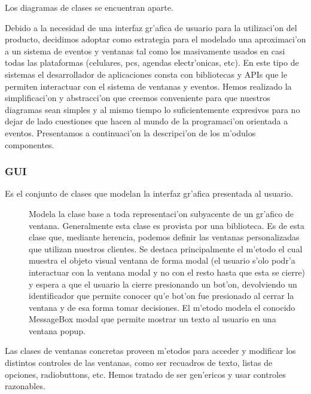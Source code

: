 Los diagramas de clases se encuentran aparte.

Debido a la necesidad de una interfaz gr'afica de usuario para la utilizaci'on del producto, decidimos adoptar como estrategia para el modelado una aproximaci'on a un sistema de eventos y ventanas tal como los masivamente usados en casi todas las plataformas (celulares, pcs, agendas electr'onicas, etc). En este tipo de sistemas el desarrollador de aplicaciones consta con bibliotecas y APIs que le permiten interactuar con el sistema de ventanas y eventos. Hemos realizado la simplificaci'on y abstracci'on que creemos conveniente para que nuestros diagramas sean simples y al mismo tiempo lo suficientemente expresivos para no dejar de lado cuestiones que hacen al mundo de la programaci'on orientada a eventos.
Presentamos a continuaci'on la descripci'on de los m'odulos componentes.
\clearpage

\subsubsection{GUI}
Es el conjunto de clases que modelan la interfaz gr'afica presentada al usuario.


\begin{description}
\item[] Modela la clase base a toda representaci'on subyacente de un gr'afico de ventana. Generalmente esta clase es provista por una biblioteca. Es de esta clase que, mediante herencia, podemos definir las ventanas personalizadas que utilizan nuestros clientes. Se destaca principalmente el m'etodo  el cual muestra el objeto visual ventana de forma modal (el usuario s'olo podr'a interactuar con la ventana modal y no con el resto hasta que esta se cierre) y espera a que el usuario la cierre presionando un bot'on, devolviendo un identificador que permite conocer qu'e bot'on fue presionado al cerrar la ventana y de esa forma tomar decisiones. El m'etodo  modela el conocido MessageBox modal que permite mostrar un texto al usuario en una ventana popup.
\end{description}

Las clases de ventanas concretas proveen m'etodos para acceder y modificar los distintos controles de las ventanas, como ser recuadros de texto, listas de opciones, radiobuttons, etc. Hemos tratado de ser gen'ericos y usar controles razonables.

